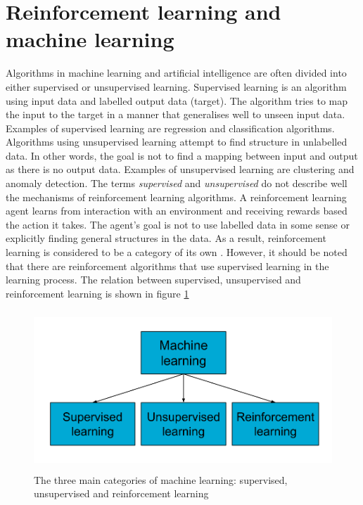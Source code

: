 \documentclass[class=book, crop=false]{standalone}
\begin{document}
\section{Reinforcement learning and machine learning}
Algorithms in machine learning and artificial intelligence are often divided into either supervised or unsupervised learning. Supervised learning is an algorithm using input data and labelled output data (target). The algorithm tries to map the input to the target in a manner that generalises well to unseen input data. Examples of supervised learning are regression and classification algorithms. Algorithms using unsupervised learning attempt to find structure in unlabelled data. In other words, the goal is not to find a mapping between input and output as there is no output data. Examples of unsupervised learning are clustering and anomaly detection. The terms \textit{supervised} and \textit{unsupervised} do not describe well the mechanisms of reinforcement learning algorithms. A reinforcement learning agent learns from interaction with an environment and receiving rewards based the action it takes. The agent's goal is not to use labelled data in some sense or explicitly finding general structures in the data. As a result, reinforcement learning is considered to be a category of its own \cite{Sutton1998}. However, it should be noted that there are reinforcement algorithms that use supervised learning in the learning process. The relation between supervised, unsupervised and reinforcement learning is shown in figure \ref{fig:theory:supervised_vs_rl}


\begin{figure}[ht!]
    \center
    \includegraphics[height=6cm, width=12cm]{figures/supervised_vs_rl.png}
    \caption[size = 9]{The three main categories of machine learning: supervised, unsupervised and reinforcement learning}
    \label{fig:theory:supervised_vs_rl}
\end{figure}
\end{document}
